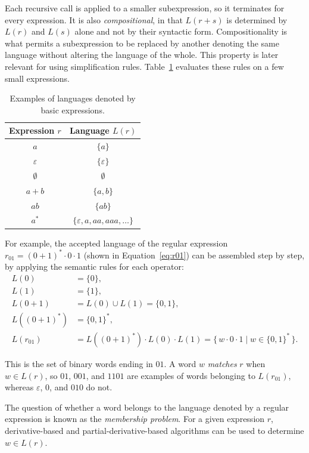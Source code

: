 Each recursive call is applied to a smaller subexpression, 
so it terminates for every expression. 
It is also \emph{compositional}, 
in that $L(r+s)$ is determined by $L(r)$ and $L(s)$ alone 
and not by their syntactic form. 
Compositionality is what permits a subexpression to be replaced by another 
denoting the same language without altering the language of the whole.
This property is later relevant for using simplification rules.
Table~\ref{tab:lang-examples} evaluates these rules on a few small expressions.

\begin{table}[ht]
\centering
\begin{tabular}{cc}
\hline
Expression $r$ & Language $L(r)$\\
\hline
$a$ & $\{a\}$ \\
$\varepsilon$ & $\{\varepsilon\}$ \\
$\emptyset$ & $\emptyset$ \\
$a+b$ & $\{a,b\}$ \\
$ab$ & $\{ab\}$ \\
$a^*$ & $\{\varepsilon,a,aa,aaa,\ldots\}$ \\
\hline
\end{tabular}
\caption{Examples of languages denoted by basic expressions.}
\label{tab:lang-examples}
\end{table}

For example, the accepted language of
the regular expression $r_{01} = (0+1)^*\cdot0\cdot1$ 
(shown in Equation~\eqref{eq:r01}) can be assembled step by step,
by applying the semantic rules for each operator:
\begin{align*}
L(0) &= \{0\}, \\
L(1) &= \{1\}, \\
L(0+1) &= L(0) \cup L(1) = \{0,1\}, \\
L((0+1)^*) &= \{0,1\}^*, \\
L(r_{01}) &= L((0+1)^*) \cdot L(0) \cdot L(1) = \{\, w \cdot 0 \cdot 1 \mid w\in\{0,1\}^* \,\}.
\end{align*}

This is the set of binary words ending in $01$.
A word $w$ \emph{matches} $r$ when $w \in L(r)$,
so $01$, $001$, and $1101$ are examples of words belonging to $L(r_{01})$, 
whereas $\varepsilon$, $0$, and $010$ do not.

The question of whether a word belongs 
to the language denoted by a regular expression
is known as the \emph{membership problem}.
For a given expression $r$,
derivative-based and partial-derivative-based algorithms
can be used to determine $w \in L(r)$.

